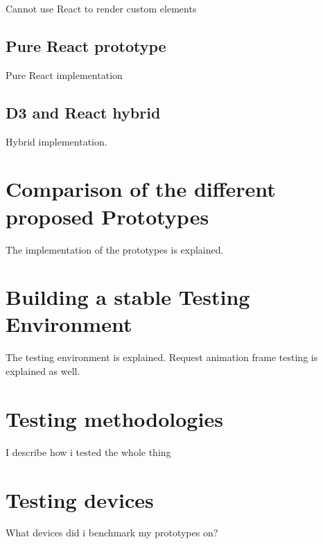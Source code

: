 Cannot use React to render custom elements

\subsection{Pure React prototype}

Pure React implementation

\subsection{D3 and React hybrid}

Hybrid implementation.

\section{Comparison of the different proposed Prototypes}

The implementation of the prototypes is explained.

\section{Building a stable Testing Environment}

The testing environment is explained. Request animation frame testing is explained as well.

\section{Testing methodologies}

I describe how i tested the whole thing

\section{Testing devices}

What devices did i benchmark my prototypes on?

